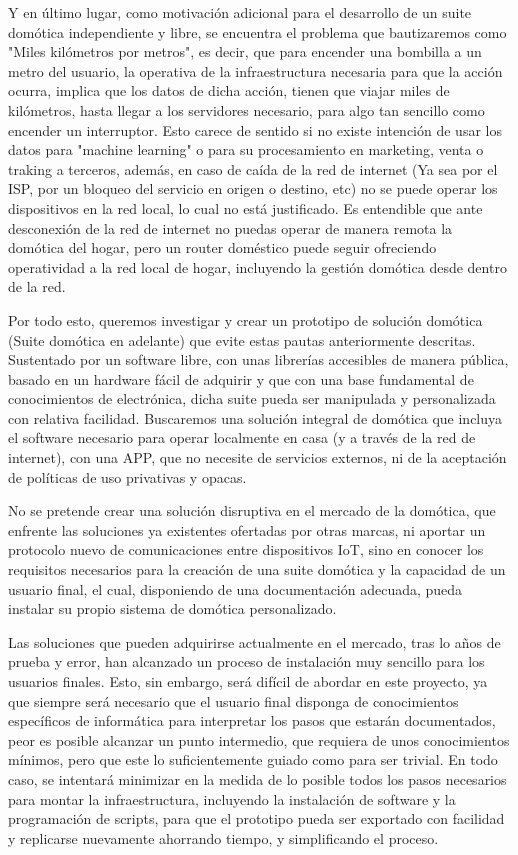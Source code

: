 Y en último lugar, como motivación adicional para el desarrollo de un suite domótica independiente y libre, se encuentra el problema que bautizaremos como "Miles kilómetros por metros", es decir, que para encender una bombilla a un metro del usuario, la operativa de la infraestructura necesaria para que la acción ocurra, implica que los datos de dicha acción, tienen que viajar miles de kilómetros, hasta llegar a los servidores necesario, para algo tan sencillo como encender un interruptor. Esto carece de sentido si no existe intención de usar los datos para "machine learning" o para su procesamiento en marketing, venta o traking a terceros, además, en caso de caída de la red de internet (Ya sea por el ISP, por un bloqueo del servicio en origen o destino, etc) no se puede operar los dispositivos en la red local, lo cual no está justificado. Es entendible que ante desconexión de la red de internet no puedas operar de manera remota la domótica del hogar, pero un router doméstico puede seguir ofreciendo operatividad a la red local de hogar, incluyendo la gestión domótica desde dentro de la red.

Por todo esto, queremos investigar y crear un prototipo de solución domótica (Suite domótica en adelante) que evite estas pautas anteriormente descritas. Sustentado por un software libre, con unas librerías accesibles de manera pública, basado en un hardware fácil de adquirir y que con una base fundamental de conocimientos de electrónica, dicha suite pueda ser manipulada y personalizada con relativa facilidad. Buscaremos una solución integral de domótica que incluya el software necesario para operar localmente en casa (y a través de la red de internet), con una APP, que no necesite de servicios externos, ni de la aceptación de políticas de uso privativas y opacas.

No se pretende crear una solución disruptiva en el mercado de la domótica, que enfrente las soluciones ya existentes ofertadas por otras marcas, ni aportar un protocolo nuevo de comunicaciones entre dispositivos IoT, sino en conocer los requisitos necesarios para la creación de una suite domótica y la capacidad de un usuario final, el cual, disponiendo de una documentación adecuada, pueda instalar su propio sistema de domótica personalizado.

Las soluciones que pueden adquirirse actualmente en el mercado, tras lo años de prueba y error, han alcanzado un proceso de instalación muy sencillo para los usuarios finales. Esto, sin embargo, será difícil de abordar en este proyecto, ya que siempre será necesario que el usuario final disponga de conocimientos específicos de informática para interpretar los pasos que estarán documentados, peor es posible alcanzar un punto intermedio, que requiera de unos conocimientos mínimos, pero que este lo suficientemente guiado como para ser trivial. En todo caso, se intentará minimizar en la medida de lo posible todos los pasos necesarios para montar la infraestructura, incluyendo la instalación de software y la programación de scripts, para que el prototipo pueda ser exportado con facilidad y replicarse nuevamente ahorrando tiempo, y simplificando el proceso.


